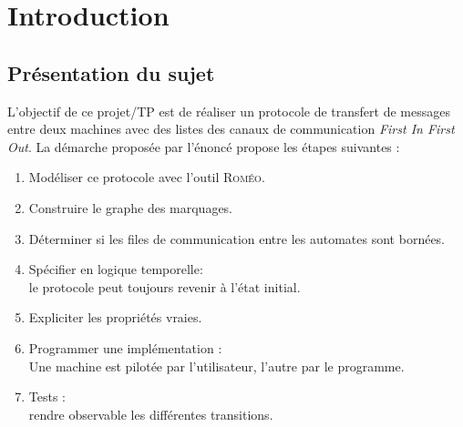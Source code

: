 \chapter{Introduction}\label{chap:Intro}
\section{Présentation du sujet}
L'objectif de ce projet/TP est de réaliser un protocole de transfert de messages entre deux machines avec des listes des canaux de communication \textit{First In First Out}. La démarche proposée par l'énoncé propose les  étapes  suivantes :
  
  
  \begin{enumerate}
  \item 
    Modéliser ce protocole avec l'outil \textsc{Roméo}.
  \item
    Construire le graphe des marquages.
  \item
    Déterminer si les files de communication entre les automates sont bornées.
  \item
    Spécifier en logique temporelle: \hfill \\
    le protocole peut toujours revenir à l’état initial.
  \item 
    Expliciter les propriétés vraies.
  \item
    Programmer une implémentation : \hfill \\
    Une machine est pilotée par l'utilisateur, l'autre par le programme.
  \item
    Tests  :\hfill \\
    rendre observable les différentes transitions.
  \end{enumerate}


